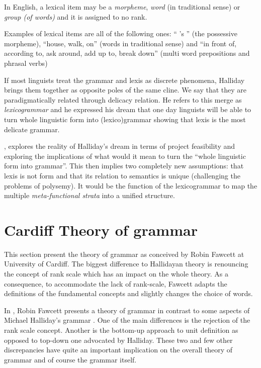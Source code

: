 \begin{definition}\label{def:lexical-item}
	In English, a lexical item may be a \textit{morpheme}, \textit{word} (in traditional sense) or \textit{group (of words)} and it is assigned to no rank. \citep[p.60]{Halliday2002}
\end{definition}

Examples of lexical items are all of the following ones: `` 's '' (the possessive morpheme), ``house, walk, on'' (words in traditional sense) and ``in front of, according to, ask around, add up to, break down'' (multi word prepositions and phrasal verbs)

If most linguists treat the grammar and lexis as discrete phenomena, Halliday brings them together as opposite poles of the same cline. We say that they are paradigmatically related through delicacy relation. He refers to this merge as \textit{lexicogrammar} and he expressed his dream that one day linguists will be able to turn whole linguistic form into (lexico)grammar showing that lexis is the most delicate grammar. 

\citet{Hasan2014}, explores the reality of Halliday's dream in terms of project feasibility and exploring the implications of what would it mean to turn the ``whole linguistic form into grammar''. This then implies two completely new assumptions: that lexis is not form and that its relation to semantics is unique (challenging the problems of polysemy). It would be the function of the lexicogrammar to map the multiple \textit{meta-functional strata} into a unified structure. 


\section{Cardiff Theory of grammar}
\label{sec:cardiff-theory-grammar}
This section present the theory of grammar as conceived by Robin Fawcett at University of Cardiff. The biggest difference to Hallidayan theory is renouncing the concept of rank scale which has an impact on the whole theory. As a consequence, to accommodate the lack of rank-scale, Fawcett adapts the definitions of the fundamental concepts and slightly changes the choice of words.

In \citeyear{Fawcett2000}, Robin Fawcett presents a theory of grammar in contrast to some aspects of Michael Halliday's grammar \citeyear{Halliday2002}. One of the main differences is the rejection of the rank scale concept. Another is the bottom-up approach to unit definition as opposed to top-down one advocated by Halliday. These two and few other discrepancies have quite an important implication on the overall theory of grammar and of course the grammar itself. 

